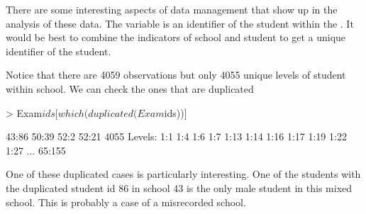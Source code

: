 \documentclass[12pt]{article}
\begin{document}
There are some interesting aspects of data management that show up in
the analysis of these data.  The  variable is an
identifier of the student within the .  It would be best
to combine the indicators of school and student to get a unique
identifier of the student.

\begin{Schunk}
\end{Schunk}
Notice that there are 4059 observations but only 4055 unique levels of
student within school.  We can check the ones that are duplicated
\begin{Schunk}
\begin{Sinput}
> Exam$ids[which(duplicated(Exam$ids))]
\end{Sinput}
\begin{Soutput}
[1] 43:86 50:39 52:2  52:21
4055 Levels: 1:1 1:4 1:6 1:7 1:13 1:14 1:16 1:17 1:19 1:22 1:27 ... 65:155
\end{Soutput}
\end{Schunk}

One of these duplicated cases is particularly interesting.  One of the
students with the duplicated student id 86 in school 43 is the only
male student in this mixed school.  This is probably a case of a
misrecorded school.
\end{document}

